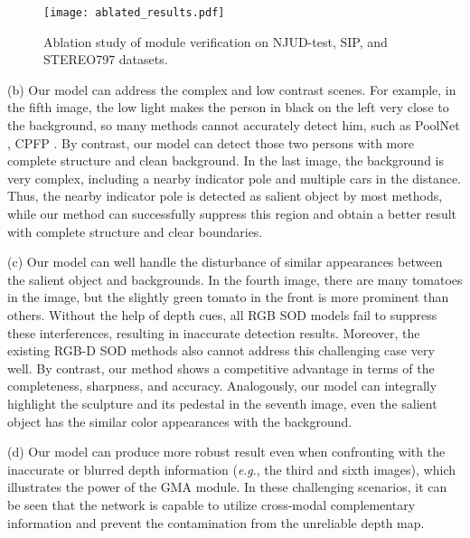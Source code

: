 \documentclass[journal]{IEEEtran}
\newcommand{\eg}{\textit{e}.\textit{g}.}
\begin{document}
\begin{figure*}[!t]
    \centering
    \texttt{[image: ablated\_results.pdf]}
    \caption{Ablation study of module verification on NJUD-test, SIP, and STEREO797 datasets.}
    \label{fig:ablation}
\end{figure*}

(b) Our model can address the complex and low contrast scenes. For example, in the fifth image, the low light makes the person in black on the left very close to the background, so many methods cannot accurately detect him, such as PoolNet \cite{Liu2019PoolSal}, CPFP \cite{zhao2019contrast}. By contrast, our model can detect those two persons with more complete structure and clean background. In the last image, the background is very complex, including a nearby indicator pole and multiple cars in the distance. Thus, the nearby indicator pole is detected as salient object by most methods, while our method can successfully suppress this region and obtain a better result with complete structure and clear boundaries.

(c) Our model can well handle the disturbance of similar appearances between the salient object and backgrounds. In the fourth image, there are many tomatoes in the image, but the slightly green tomato in the front is more prominent than others. Without the help of depth cues, all RGB SOD models fail to suppress these interferences, resulting in inaccurate detection results. Moreover, the existing RGB-D SOD methods also cannot address this challenging case very well. By contrast, our method shows a competitive advantage in terms of the completeness, sharpness, and accuracy. Analogously, our model can integrally highlight the sculpture and its pedestal in the seventh image, even the salient object has the similar color appearances with the background.

(d) Our model can produce more robust result even when confronting with the inaccurate or blurred depth information (\eg, the third and sixth images), which illustrates the power of the GMA module. In these challenging scenarios, it can be seen that the network is capable to utilize cross-modal complementary information and prevent the contamination from the unreliable depth map.
\end{document}
